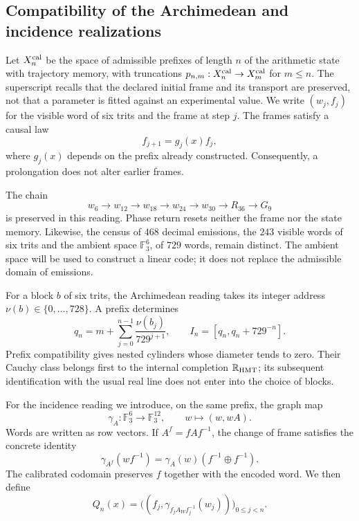 



\subsection{Compatibility of the Archimedean and incidence realizations}
\label{x_reciprocidad:exc:doble-lectura}

Let $X_n^{\rm cal}$ be the space of admissible prefixes of length $n$ of the
arithmetic state with trajectory memory, with truncations
$p_{n,m}:X_n^{\rm cal}\to X_m^{\rm cal}$ for $m\leq n$. The superscript
recalls that the declared initial frame and its transport are preserved, not
that a parameter is fitted against an experimental value. We write
$(w_j,f_j)$ for the visible word of six trits and the frame at step
$j$. The frames satisfy a causal law
\[
 f_{j+1}=g_j(x)f_j,
\]
where $g_j(x)$ depends on the prefix already constructed. Consequently, a
prolongation does not alter earlier frames.

The chain
\[
 w_6\longrightarrow w_{12}\longrightarrow w_{18}
 \longrightarrow w_{24}\longrightarrow w_{30}
 \longrightarrow R_{36}\longrightarrow G_9
\]
is preserved in this reading. Phase return resets neither the
frame nor the state memory. Likewise, the census of
$468$ decimal emissions, the $243$ visible words of six
trits and the ambient space $\mathbb F_3^6$, of $729$ words, remain distinct. The ambient space
will be used to construct a linear code; it does not replace the admissible
domain of emissions.

For a block $b$ of six trits, the Archimedean reading takes its
integer address $\nu(b)\in\{0,\ldots,728\}$. A prefix determines
\[
 q_n=m+\sum_{j=0}^{n-1}\frac{\nu(b_j)}{729^{j+1}},
 \qquad I_n=[q_n,q_n+729^{-n}].
\]
Prefix compatibility gives nested cylinders whose diameter tends
to zero. Their Cauchy class belongs first to the internal completion
$\mathbb R_{\rm HMT}$; its subsequent identification with the usual real
line does not enter into the choice of blocks.

For the incidence reading we introduce, on the same prefix, the
graph map
\begin{equation}
 \gamma_A:\mathbb F_3^6\longrightarrow\mathbb F_3^{12},
 \qquad w\longmapsto(w,wA).
 \label{x_reciprocidad:exc:gamma}
\end{equation}
Words are written as row vectors. If $A^f=fAf^{-1}$, the
change of frame satisfies the concrete identity
\begin{equation}
 \gamma_{A^f}(wf^{-1})
   =\gamma_A(w)(f^{-1}\oplus f^{-1}).
 \label{x_reciprocidad:exc:covariancia}
\end{equation}
The calibrated codomain preserves $f$ together with the encoded word.
We then define
\begin{equation}
 Q_n(x)=\bigl((f_j,\gamma_{f_jA_Wf_j^{-1}}(w_j))\bigr)_{0\leq j<n}.
 \label{x_reciprocidad:exc:qn}
\end{equation}

